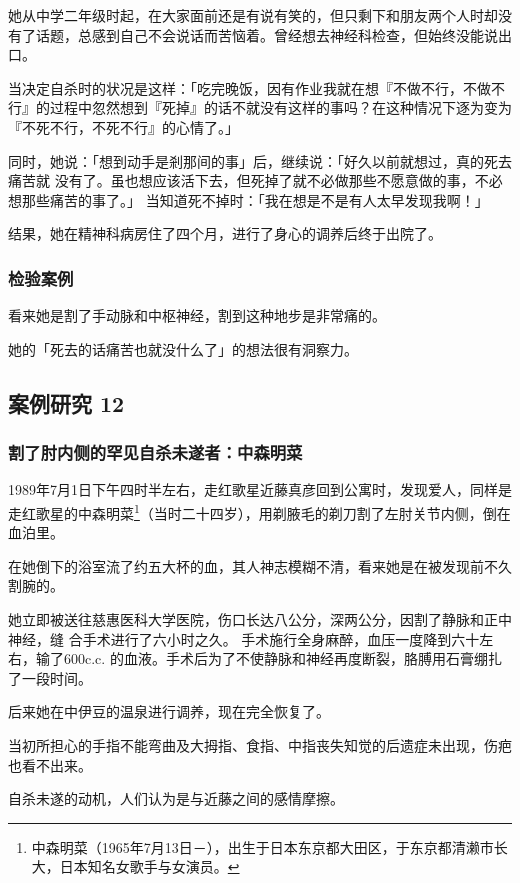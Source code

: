 \documentclass[UTF8]{ctexart}
\begin{document}
她从中学二年级时起，在大家面前还是有说有笑的，但只剩下和朋友两个人时却没有了话题，总感到自己不会说话而苦恼着。曾经想去神经科检查，但始终没能说出口。

当决定自杀时的状况是这样：「吃完晚饭，因有作业我就在想『不做不行，不做不行』的过程中忽然想到『死掉』的话不就没有这样的事吗？在这种情况下逐为变为『不死不行，不死不行』的心情了。」

同时，她说：「想到动手是剎那间的事」后，继续说：「好久以前就想过，真的死去痛苦就 没有了。虽也想应该活下去，但死掉了就不必做那些不愿意做的事，不必想那些痛苦的事了。」 当知道死不掉时：「我在想是不是有人太早发现我啊！」

结果，她在精神科病房住了四个月，进行了身心的调养后终于出院了。

\subsubsection*{检验案例}

看来她是割了手动脉和中枢神经，割到这种地步是非常痛的。

她的「死去的话痛苦也就没什么了」的想法很有洞察力。

\subsection{案例研究 12}
\subsubsection*{割了肘内侧的罕见自杀未遂者：中森明菜}

1989年7月1日下午四时半左右，走红歌星近藤真彦回到公寓时，发现爱人，同样是走红歌星的中森明菜\footnote{中森明菜（1965年7月13日－\qquad \qquad ），出生于日本东京都大田区，于东京都清濑市长大，日本知名女歌手与女演员。}（当时二十四岁），用剃腋毛的剃刀割了左肘关节内侧，倒在血泊里。

在她倒下的浴室流了约五大杯的血，其人神志模糊不清，看来她是在被发现前不久割腕的。

她立即被送往慈惠医科大学医院，伤口长达八公分，深两公分，因割了静脉和正中神经，缝 合手术进行了六小时之久。
手术施行全身麻醉，血压一度降到六十左右，输了$600$c.c. 的血液。手术后为了不使静脉和神经再度断裂，胳膊用石膏绷扎了一段时间。 

后来她在中伊豆的温泉进行调养，现在完全恢复了。

当初所担心的手指不能弯曲及大拇指、食指、中指丧失知觉的后遗症未出现，伤疤也看不出来。

自杀未遂的动机，人们认为是与近藤之间的感情摩擦。
\end{document}
